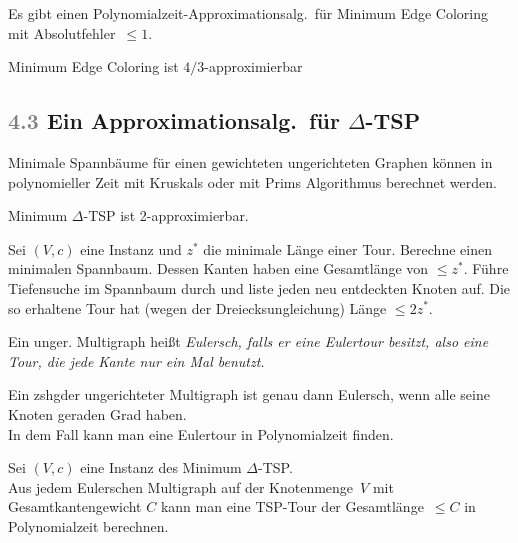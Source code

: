 \documentclass{cheat-sheet}
\newcommand{\Problem}[1]{\textcolor{ProblemColor}{\textbf{#1}}}
\newcommand{\scriptSection}[1]{\textcolor{gray}{#1}\enspace}
\begin{document}
\begin{kor}
  Es gibt einen Polynomialzeit-Approximationsalg.\ für Minimum Edge Coloring mit Absolutfehler~$\leq 1$.
\end{kor}

\begin{kor}
  Minimum Edge Coloring ist $4/3$-approximierbar
\end{kor}

\subsection{\scriptSection{4.3} Ein Approximationsalg.\ für \Problem{$\Delta$-TSP}}

\begin{erinnerung}
  Minimale Spannbäume für einen gewichteten ungerichteten Graphen können in polynomieller Zeit mit Kruskals oder mit Prims Algorithmus berechnet werden.
\end{erinnerung}

\begin{satz}
  Minimum $\Delta$-TSP ist 2-approximierbar.
\end{satz}

\begin{beweisskizze}
  Sei $(V, c)$ eine Instanz und $z^*$ die minimale Länge einer Tour.
  Berechne einen minimalen Spannbaum.
  Dessen Kanten haben eine Gesamtlänge von $\leq z^*$.
  Führe Tiefensuche im Spannbaum durch und liste jeden neu entdeckten Knoten auf.
  Die so erhaltene Tour hat (wegen der Dreiecksungleichung) Länge $\leq 2 z^*$.
\end{beweisskizze}

\begin{defn}
  Ein unger. Multigraph heißt \em{Eulersch}, falls er eine \textit{Eulertour} besitzt, also eine Tour, die jede Kante nur ein Mal benutzt.
\end{defn}

\begin{lem}
  Ein zshgder ungerichteter Multigraph ist genau dann Eulersch, wenn alle seine Knoten geraden Grad haben. \\
  In dem Fall kann man eine Eulertour in Polynomialzeit finden.
\end{lem}

\begin{kor}
  Sei $(V, c)$ eine Instanz des Minimum $\Delta$-TSP. \\
  Aus jedem Eulerschen Multigraph auf der Knotenmenge~$V$ mit Gesamtkantengewicht $C$ kann man eine TSP-Tour der Gesamtlänge~$\leq C$ in Polynomialzeit berechnen.
\end{kor}
\end{document}
